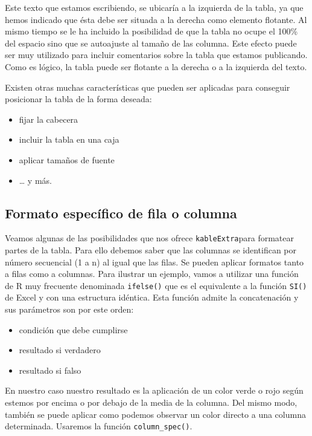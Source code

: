 \documentclass[
]{book}
\providecommand{\tightlist}{%
  \setlength{\itemsep}{0pt}\setlength{\parskip}{0pt}}
\begin{document}
Este texto que estamos escribiendo, se ubicaría a la izquierda de la tabla, ya que hemos indicado que ésta debe ser situada a la derecha como elemento flotante. Al mismo tiempo se le ha incluido la posibilidad de que la tabla no ocupe el 100\% del espacio sino que se autoajuste al tamaño de las columna. Este efecto puede ser muy utilizado para incluir comentarios sobre la tabla que estamos publicando. Como es lógico, la tabla puede ser flotante a la derecha o a la izquierda del texto.

Existen otras muchas características que pueden ser aplicadas para conseguir posicionar la tabla de la forma deseada:

\begin{itemize}
\tightlist
\item
  fijar la cabecera
\item
  incluir la tabla en una caja
\item
  aplicar tamaños de fuente
\item
  \ldots{} y más.
\end{itemize}

\hypertarget{formato-especuxedfico-de-fila-o-columna}{%
\subsection{Formato específico de fila o columna}\label{formato-especuxedfico-de-fila-o-columna}}

Veamos algunas de las posibilidades que nos ofrece \texttt{kableExtra}para formatear partes de la tabla. Para ello debemos saber que las columnas se identifican por número secuencial (1 a n) al igual que las filas. Se pueden aplicar formatos tanto a filas como a columnas. Para ilustrar un ejemplo, vamos a utilizar una función de R muy frecuente denominada \texttt{ifelse()} que es el equivalente a la función \texttt{SI()} de Excel y con una estructura idéntica. Esta función admite la concatenación y sus parámetros son por este orden:

\begin{itemize}
\tightlist
\item
  condición que debe cumplirse
\item
  resultado si verdadero
\item
  resultado si falso
\end{itemize}

En nuestro caso nuestro resultado es la aplicación de un color verde o rojo según estemos por encima o por debajo de la media de la columna. Del mismo modo, también se puede aplicar como podemos observar un color directo a una columna determinada. Usaremos la función \texttt{column\_spec()}.
\end{document}
